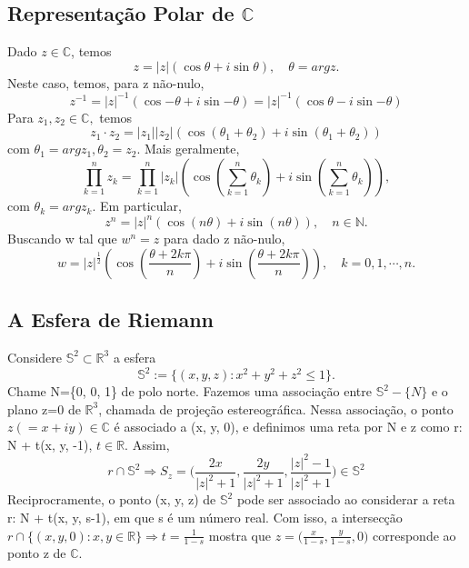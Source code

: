 \documentclass{article}
\begin{document}
  \subsection{Representa\c c\~ao Polar de $\mathbb{C}$}
  Dado $z\in \mathbb{C}$, temos 
  $$
  z = |z|(\cos{\theta} + i\sin{\theta}), \quad \theta = arg z.
  $$
  Neste caso, temos, para z n\~ao-nulo,
  $$
  z ^{-1} = |z|^{-1}(\cos{-\theta} + i\sin{-\theta}) = |z|^{-1}(\cos{\theta}-i\sin{-\theta})
  $$
  Para $z _{1}, z _{2}\in \mathbb{C},$ temos
  $$
  z _{1}\cdot z _{2} = |z _{1}||z _{2}|(\cos(\theta _{1} + \theta _{2}) + i\sin(\theta _{1} + \theta _{2}))
  $$
com $\theta _{1} = arg z _{1}, \theta _{2} = z _{2}.$ Mais geralmente, 
  $$
  \prod_{k=1}^{n}z _{k} = \prod_{k=1}^{n} |z _{k}|(\cos(\sum_{k=1}^{n}\theta _{k}) + i\sin(\sum_{k=1}^{n}\theta _{k})),
  $$
com $\theta _{k} = arg z _{k}$. Em particular, 
  $$
  z ^{n} = |z|^{n}(\cos(n\theta)+i\sin(n \theta)), \quad n\in \mathbb{N}.
  $$
  Buscando w tal que $w ^{n} = z$ para dado z n\~ao-nulo,
  $$
  w = |z|^{\frac{1}{2}}(\cos(\frac{\theta + 2k\pi}{n}) + i\sin(\frac{\theta + 2k\pi}{n})), \quad k = 0, 1, \cdots, n.
  $$

  \subsection{A Esfera de Riemann}
  Considere $\mathbb{S}^{2}\subset{\mathbb{R}^{3}}$ a esfera 
  $$
  \mathbb{S}^{2}:= \{(x, y, z): x ^{2} + y ^{2} + z ^{2}\leq{1}\}.
  $$
  Chame N=\{0, 0, 1\} de polo norte. Fazemos uma associa\c c\~ao entre $\mathbb{S}^{2}-\{N\}$ e o plano z=0 de $\mathbb{R}^{3}$,
chamada de proje\c c\~ao estereogr\'afica. Nessa associa\c c\~ao, o ponto $z(=x + iy)\in\mathbb{C}$ \'e associado a (x, y, 0), e
definimos uma reta por N e z como r: N + t(x, y, -1), $t\in \mathbb{R}$. Assim,
  $$
  r\cap{\mathbb{S}^{2}} \Rightarrow S _{z} = \biggl(\frac{2x}{|z|^{2}+1}, \frac{2y}{|z|^{2}+1}, \frac{|z|^{2}-1}{|z|^{2}+1}\biggr)\in \mathbb{S}^{2}
  $$
  Reciprocramente, o ponto (x, y, z) de $\mathbb{S}^{2}$ pode ser associado ao considerar a reta r: N + t(x, y, s-1), em que
s \'e um n\'umero real. Com isso, a intersec\c c\~ao $r\cap \{(x, y, 0): x, y \in \mathbb{R}\}\Rightarrow t=\frac{1}{1-s}$ mostra que 
$z = \biggl(\frac{x}{1-s}, \frac{y}{1-s}, 0\biggr)$ corresponde ao ponto z de $\mathbb{C}$.
  
\end{document}
